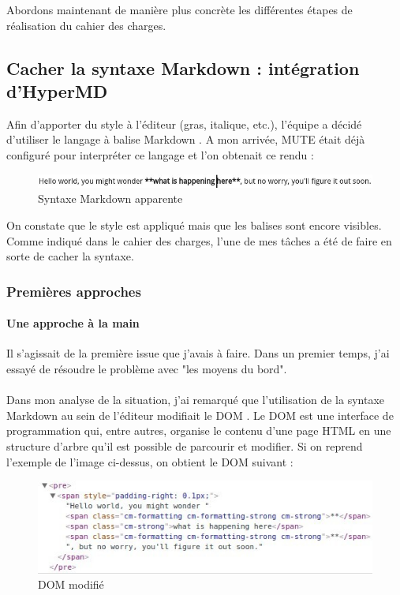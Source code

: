 \documentclass[12pt]{article}
\begin{document}
\newpage
Abordons maintenant de manière plus concrète les différentes étapes de réalisation du cahier des charges.\\

\subsection{Cacher la syntaxe Markdown : intégration d'HyperMD}
Afin d'apporter du style à l'éditeur (gras, italique, etc.), l'équipe a décidé d'utiliser le langage à balise Markdown \cite{markdown}. A mon arrivée, MUTE était déjà configuré pour interpréter ce langage et l'on obtenait ce rendu :

\begin{figure}[H]
    \centering
    \includegraphics[scale=0.65]{gallery/style_example.jpg}
    \caption[nom dans le sommaire]{Syntaxe Markdown apparente}
    \label{fig:gallery3}
\end{figure}

On constate que le style est appliqué mais que les balises sont encore visibles. Comme indiqué dans le cahier des charges, l'une de mes tâches a été de faire en sorte de cacher la syntaxe.

\subsubsection{Premières approches}
\paragraph{Une approche à la main}
Il s'agissait de la première issue que j'avais à faire. Dans un premier temps, j'ai essayé de résoudre le problème avec "les moyens du bord".
\paragraph{}
Dans mon analyse de la situation, j'ai remarqué que l'utilisation de la syntaxe Markdown au sein de l'éditeur modifiait le DOM \cite{dom}. Le DOM est une interface de programmation qui, entre autres, organise le contenu d'une page HTML en une structure d'arbre qu'il est possible de parcourir et modifier. Si on reprend l'exemple de l'image ci-dessus, on obtient le DOM suivant :
\begin{figure}[H]
    \centering
    \includegraphics[scale=0.95]{gallery/modified_dom.jpg}
    \caption[nom dans le sommaire]{DOM modifié}
    \label{fig:gallery4}
\end{figure}
\end{document}
